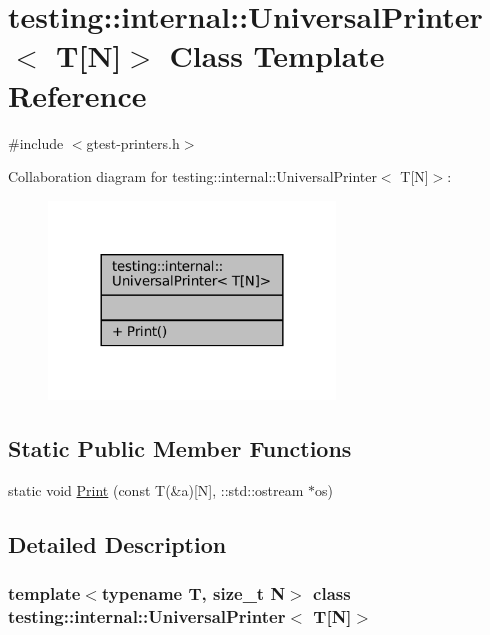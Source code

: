\hypertarget{classtesting_1_1internal_1_1UniversalPrinter_3_01T[N]_4}{}\section{testing\+:\+:internal\+:\+:Universal\+Printer$<$ T\mbox{[}N\mbox{]}$>$ Class Template Reference}
\label{classtesting_1_1internal_1_1UniversalPrinter_3_01T[N]_4}


{\ttfamily \#include $<$gtest-\/printers.\+h$>$}



Collaboration diagram for testing\+:\+:internal\+:\+:Universal\+Printer$<$ T\mbox{[}N\mbox{]}$>$\+:
\nopagebreak
\begin{figure}[H]
\begin{center}
\leavevmode
\includegraphics[width=216pt]{classtesting_1_1internal_1_1UniversalPrinter_3_01T[N]_4__coll__graph}
\end{center}
\end{figure}
\subsection*{Static Public Member Functions}
\begin{DoxyCompactItemize}
\item 
static void \hyperlink{classtesting_1_1internal_1_1UniversalPrinter_3_01T[N]_4_a1cf0e7c8db59c090f769116c6421b212}{Print} (const T(\&a)\mbox{[}N\mbox{]}, \+::std\+::ostream $\ast$os)
\end{DoxyCompactItemize}


\subsection{Detailed Description}
\subsubsection*{template$<$typename T, size\+\_\+t N$>$\newline
class testing\+::internal\+::\+Universal\+Printer$<$ T\mbox{[}\+N\mbox{]}$>$}



